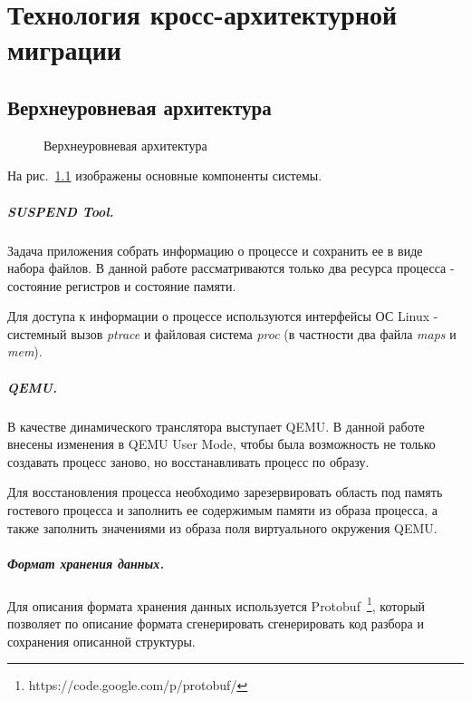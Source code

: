 \chapter{Технология кросс-архитектурной миграции}

\section{Верхнеуровневая архитектура}

\begin{figure}[h]
\caption{Верхнеуровневая архитектура}
\label{pic:common_arch}
\end{figure}

На рис.~\ref{pic:common_arch} изображены основные компоненты системы.

\paragraph{SUSPEND Tool.}

Задача приложения собрать информацию о процессе и сохранить ее в виде набора файлов. В данной работе рассматриваются только два ресурса процесса - состояние регистров и состояние памяти.

Для доступа к информации о процессе используются интерфейсы ОС Linux - системный вызов \textit{ptrace} и файловая система \textit{proc} (в частности два файла \textit{maps} и \textit{mem}).

\paragraph{QEMU.}

В качестве динамического транслятора выступает QEMU. В данной работе внесены изменения в QEMU User Mode, чтобы была возможность не только создавать процесс заново, но восстанавливать процесс по образу.

Для восстановления процесса необходимо зарезервировать область под память гостевого процесса и заполнить ее содержимым памяти из образа процесса, а также заполнить значениями из образа поля виртуального окружения QEMU.

\paragraph{Формат хранения данных.}

Для описания формата хранения данных используется Protobuf~\footnote{https://code.google.com/p/protobuf/}, который позволяет по описание формата сгенерировать сгенерировать код разбора и сохранения описанной структуры.

